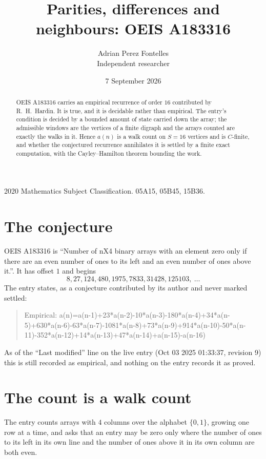 \documentclass[11pt,a4paper]{article}
\title{Parities, differences and neighbours: OEIS A183316}
\author{Adrian Perez Fontelles\\ \small Independent researcher}
\date{7 September 2026}
\theoremstyle{plain}
\theoremstyle{definition}
\begin{document}
\maketitle

\begin{abstract}
OEIS A183316 carries an empirical recurrence of order $16$ contributed by R.~H.~Hardin. It is
true, and it is decidable rather than empirical. The entry's condition is decided by a bounded amount of state carried down the array; the
admissible windows are the vertices of a finite digraph and the arrays counted are exactly the
walks in it. Hence $a(n)$ is a walk count on $S=16$ vertices and is $C$-finite, and whether the
conjectured recurrence annihilates it is settled by a finite exact computation, with the
Cayley--Hamilton theorem bounding the work.
\end{abstract}

\noindent\small 2020 Mathematics Subject Classification. 05A15, 05B45, 15B36.\normalsize

\section{The conjecture}

OEIS A183316 is ``Number of nX4 binary arrays with an element zero only if there are an even number of ones to its left and an even number of ones above it.''. It has offset $1$ and begins
\[
8, 27, 124, 480, 1975, 7833, 31428, 125103,\ \dots
\]
The entry states, as a conjecture contributed by its author and never marked settled:
\begin{quote}
Empirical: a(n)=a(n-1)+23*a(n-2)-10*a(n-3)-180*a(n-4)+34*a(n-5)+630*a(n-6)-63*a(n-7)-1081*a(n-8)+73*a(n-9)+914*a(n-10)-50*a(n-11)-352*a(n-12)+14*a(n-13)+47*a(n-14)+a(n-15)-a(n-16)
\end{quote}
As of the ``Last modified'' line on the live entry (Oct 03 2025 01:33:37, revision 9) this is still
recorded as empirical, and nothing on the entry records it as proved.

\section{The count is a walk count}

The entry counts arrays with $4$ columns over the alphabet $\{0,1\}$, growing one row at a time, and asks that an entry may be zero only where the number of ones to its left in its own line and the number of ones above it in its own column are both even.
\end{document}
